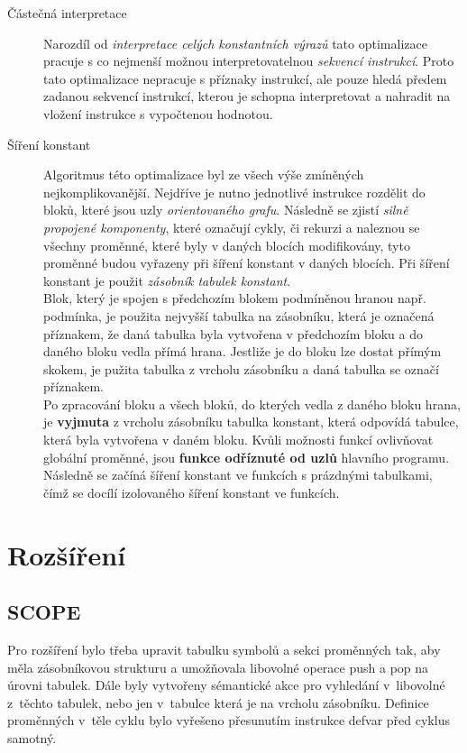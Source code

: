 \begin{description}
    \item[Částečná interpretace] Narozdíl od \emph{interpretace celých konstantních výrazů} tato optimalizace pracuje s co nejmenší možnou interpretovatelnou \emph{sekvencí instrukcí}. Proto tato optimalizace nepracuje s příznaky instrukcí, ale pouze hledá předem zadanou sekvencí instrukcí, kterou je schopna interpretovat a nahradit na vložení instrukce s vypočtenou hodnotou.
    
    \item[Šíření konstant] Algoritmus této optimalizace byl ze všech výše zmíněných nejkomplikovanější. Nejdříve je nutno jednotlivé instrukce rozdělit do bloků, které jsou uzly \emph{orientovaného grafu}. Následně se zjistí \emph{silně propojené komponenty}, které označují cykly, či rekurzi a naleznou se všechny proměnné, které byly v daných blocích modifikovány, tyto proměnné budou vyřazeny při šíření konstant v daných blocích. Při šíření konstant je použit \emph{zásobník tabulek konstant}. \\Blok, který je spojen s předchozím blokem podmíněnou hranou např. podmínka, je použita nejvyšší tabulka na zásobníku, která je označená příznakem, že daná tabulka byla vytvořena v předchozím bloku a do daného bloku vedla přímá hrana. Jestliže je do bloku lze dostat přímým skokem, je pužita tabulka z vrcholu zásobníku a daná tabulka se označí příznakem. \\Po zpracování bloku a všech bloků, do kterých vedla z daného bloku hrana, je \textbf{vyjmuta} z vrcholu zásobníku tabulka konstant, která odpovídá tabulce, která byla vytvořena v daném bloku. Kvůli možnosti funkcí ovlivňovat globální proměnné, jsou \textbf{funkce odříznuté od uzlů} hlavního programu. Následně se začíná šíření konstant ve funkcích s prázdnými tabulkami, čímž se docílí izolovaného šíření konstant ve funkcích.
\end{description}

\section{Rozšíření}

\subsection{SCOPE}
Pro rozšíření bylo třeba upravit tabulku symbolů a sekci proměnných tak, aby
měla zásobníkovou strukturu a umožňovala libovolné operace push a pop na úrovni tabulek.
Dále byly vytvořeny sémantické akce pro vyhledání v~libovolné z~těchto tabulek,
nebo jen v~tabulce která je na vrcholu zásobníku. Definice proměnných v~těle cyklu
bylo vyřešeno přesunutím instrukce defvar před cyklus samotný.

